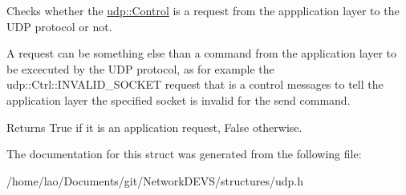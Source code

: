 Checks whether the \hyperlink{structudp_1_1Control}{udp\+::\+Control} is a request from the appplication layer to the U\+DP protocol or not. 

A request can be something else than a command from the application layer to be excecuted by the U\+DP protocol, as for example the udp\+::\+Ctrl\+::\+I\+N\+V\+A\+L\+I\+D\+\_\+\+S\+O\+C\+K\+ET request that is a control messages to tell the application layer the specified socket is invalid for the send command.

\begin{DoxyReturn}{Returns}
True if it is an application request, False otherwise. 
\end{DoxyReturn}


The documentation for this struct was generated from the following file\+:\begin{DoxyCompactItemize}
\item 
/home/lao/\+Documents/git/\+Network\+D\+E\+V\+S/structures/udp.\+h\end{DoxyCompactItemize}
